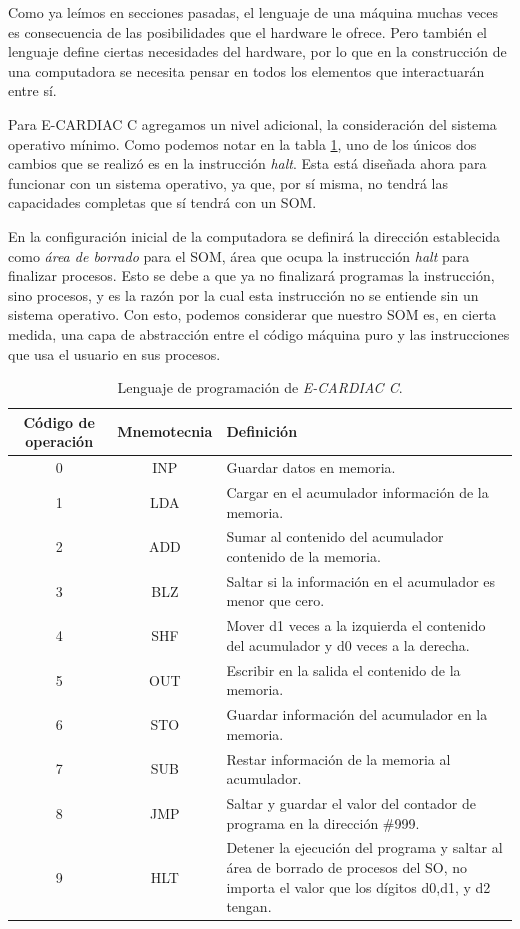 \documentclass[letterpaper,12pt,oneside]{book}
\begin{document}
		Como ya leímos en secciones pasadas, el lenguaje de una máquina muchas veces es consecuencia de las posibilidades que el hardware le ofrece. 
		Pero
		también el lenguaje define ciertas necesidades del hardware, por lo que en la construcción de una computadora se necesita pensar en todos
		los elementos que interactuarán entre sí. 
  
        Para E-CARDIAC C agregamos un nivel adicional, la consideración del sistema operativo mínimo. Como
		podemos notar en la tabla \ref{tab:programing_language_ecc}, uno de los únicos dos cambios que se realizó es en la instrucción \textit{halt}. Esta está diseñada ahora para funcionar con un sistema operativo, ya que, por sí misma, no tendrá las capacidades completas que sí tendrá con un SOM.
        
        En la configuración inicial de la computadora se definirá la dirección  establecida como \textit{área de borrado} para el SOM, área que ocupa la instrucción \textit{halt} para finalizar procesos. Esto se debe a que ya no finalizará programas la instrucción, sino procesos, y es la razón por la cual
        esta instrucción no se entiende sin un sistema operativo. Con esto,
		podemos considerar que nuestro SOM es, en cierta medida, una capa de abstracción entre el código máquina puro y las instrucciones que usa el usuario en sus procesos.

		
		
			\begin{table}[h]
			  \centering
			  \begin{tabular}{|c|c|p{8cm}|}
			    \hline
		    	\textbf{Código de operación} & \textbf{Mnemotecnia} & \textbf{Definición} \\
			    \hline
			    0 & INP & Guardar datos en memoria.\\
			    \hline
				1 & LDA & Cargar en el acumulador información de la memoria.\\
				\hline
			    2 & ADD & Sumar al contenido del acumulador contenido de la memoria.\\
			    \hline
			    3 & BLZ & Saltar si la información en el acumulador es menor que cero.\\
			    \hline
			    4 & SHF & Mover d1 veces a la izquierda el contenido del acumulador y d0 veces a la derecha.\\
			    \hline
			    5 & OUT & Escribir en la salida el contenido de la memoria.\\
			    \hline
			    6 & STO & Guardar información del acumulador en la memoria.\\
			    \hline
			    7 & SUB & Restar información de la memoria al acumulador.\\
			    \hline
			    8 & JMP & Saltar y guardar el valor del contador de programa en la dirección \#999. \\
			    \hline
			    9 & HLT & Detener la ejecución del programa y saltar al área de borrado de procesos del SO, no importa el valor que los dígitos d0,d1, y d2 tengan.\\
			    \hline
			  \end{tabular}
			  \caption{Lenguaje de programación de \textit{E-CARDIAC C}.}
			  \label{tab:programing_language_ecc}
			\end{table}
 
\end{document}
